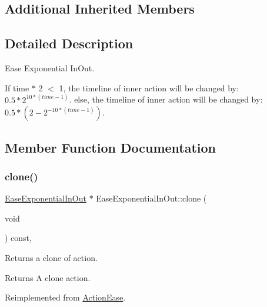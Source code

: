 \subsection*{Additional Inherited Members}


\subsection{Detailed Description}
Ease Exponential In\+Out. 

If time $\ast$ 2 $<$ 1, the timeline of inner action will be changed by\+: $0.5*{ 2 }^{ 10*(time-1) }$. else, the timeline of inner action will be changed by\+: $0.5*(2-{ 2 }^{ -10*(time-1) })$. 

\subsection{Member Function Documentation}
\mbox{\label{classEaseExponentialInOut_a04bfa04ce8c396bdd5d058cfc771b9cb}} 
\subsubsection{\texorpdfstring{clone()}{clone()}}
{\footnotesize\ttfamily \hyperlink{classEaseExponentialInOut}{Ease\+Exponential\+In\+Out} $\ast$ Ease\+Exponential\+In\+Out\+::clone (\begin{DoxyParamCaption}\item[{void}]{ }\end{DoxyParamCaption}) const\hspace{0.3cm}{\ttfamily [override]}, {\ttfamily [virtual]}}

Returns a clone of action.

\begin{DoxyReturn}{Returns}
A clone action. 
\end{DoxyReturn}


Reimplemented from \hyperlink{classActionEase_a39bec93fe161fb732a74d8e51a2fe08b}{Action\+Ease}.

\mbox{\label{classEaseExponentialInOut_ad8a47b8472e752b8aeae8faa290a0f1f}} 
